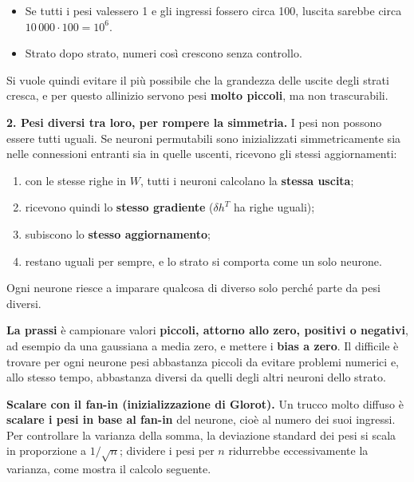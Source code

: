 \documentclass[11pt,a4paper,oneside,openany]{book}
\providecommand{\tightlist}{\setlength{\itemsep}{0pt}\setlength{\parskip}{0pt}}
\begin{document}
\begin{itemize}
\tightlist
\item
  Se tutti i pesi valessero 1 e gli ingressi fossero circa 100, l\textquotesingle uscita sarebbe circa \(10\,000\cdot100 = 10^6\).
\item
  Strato dopo strato, numeri così crescono senza controllo.
\end{itemize}

Si vuole quindi evitare il più possibile che la grandezza delle uscite degli strati cresca, e per questo all\textquotesingle inizio servono pesi \textbf{molto piccoli}, ma non trascurabili.

\textbf{2. Pesi diversi tra loro, per rompere la simmetria.} I pesi non possono essere tutti uguali. Se neuroni permutabili sono inizializzati simmetricamente sia nelle connessioni entranti sia in quelle uscenti, ricevono gli stessi aggiornamenti:

\begin{enumerate}
\def\labelenumi{\arabic{enumi}.}
\tightlist
\item
  con le stesse righe in \(W\), tutti i neuroni calcolano la \textbf{stessa uscita};
\item
  ricevono quindi lo \textbf{stesso gradiente} (\(\delta h^T\) ha righe uguali);
\item
  subiscono lo \textbf{stesso aggiornamento};
\item
  restano uguali per sempre, e lo strato si comporta come un solo neurone.
\end{enumerate}

Ogni neurone riesce a imparare qualcosa di diverso solo perché parte da pesi diversi.

\textbf{La prassi} è campionare valori \textbf{piccoli, attorno allo zero, positivi o negativi}, ad esempio da una gaussiana a media zero, e mettere i \textbf{bias a zero}. Il difficile è trovare per ogni neurone pesi abbastanza piccoli da evitare problemi numerici e, allo stesso tempo, abbastanza diversi da quelli degli altri neuroni dello strato.

\textbf{Scalare con il fan-in (inizializzazione di Glorot).} Un trucco molto diffuso è \textbf{scalare i pesi in base al fan-in} del neurone, cioè al numero dei suoi ingressi. Per controllare la varianza della somma, la deviazione standard dei pesi si scala in proporzione a \(1/\sqrt{n}\); dividere i pesi per \(n\) ridurrebbe eccessivamente la varianza, come mostra il calcolo seguente.
\end{document}
